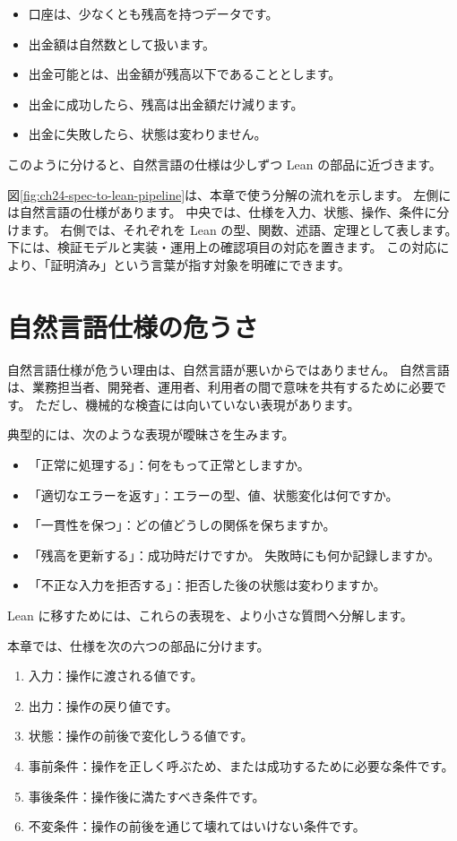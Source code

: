 \begin{itemize}
\item 口座は、少なくとも残高を持つデータです。
\item 出金額は自然数として扱います。
\item 出金可能とは、出金額が残高以下であることとします。
\item 出金に成功したら、残高は出金額だけ減ります。
\item 出金に失敗したら、状態は変わりません。
\end{itemize}

このように分けると、自然言語の仕様は少しずつ Lean の部品に近づきます。


図\ref{fig:ch24-spec-to-lean-pipeline}は、本章で使う分解の流れを示します。
左側には自然言語の仕様があります。
中央では、仕様を入力、状態、操作、条件に分けます。
右側では、それぞれを Lean の型、関数、述語、定理として表します。
下には、検証モデルと実装・運用上の確認項目の対応を置きます。
この対応により、「証明済み」という言葉が指す対象を明確にできます。

\section{自然言語仕様の危うさ}

自然言語仕様が危うい理由は、自然言語が悪いからではありません。
自然言語は、業務担当者、開発者、運用者、利用者の間で意味を共有するために必要です。
ただし、機械的な検査には向いていない表現があります。

典型的には、次のような表現が曖昧さを生みます。

\begin{itemize}
\item 「正常に処理する」：何をもって正常としますか。
\item 「適切なエラーを返す」：エラーの型、値、状態変化は何ですか。
\item 「一貫性を保つ」：どの値どうしの関係を保ちますか。
\item 「残高を更新する」：成功時だけですか。
失敗時にも何か記録しますか。
\item 「不正な入力を拒否する」：拒否した後の状態は変わりますか。
\end{itemize}

Lean に移すためには、これらの表現を、より小さな質問へ分解します。

本章では、仕様を次の六つの部品に分けます。
\begin{enumerate}
\item 入力：操作に渡される値です。
\item 出力：操作の戻り値です。
\item 状態：操作の前後で変化しうる値です。
\item 事前条件：操作を正しく呼ぶため、または成功するために必要な条件です。
\item 事後条件：操作後に満たすべき条件です。
\item 不変条件：操作の前後を通じて壊れてはいけない条件です。
\end{enumerate}

